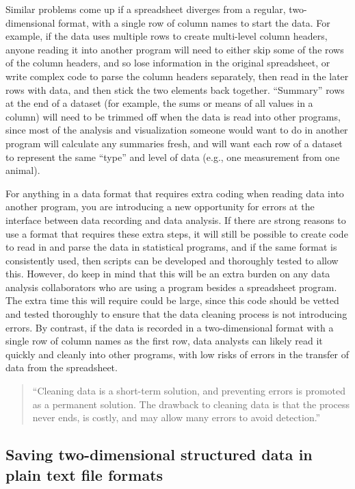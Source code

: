 \documentclass[]{tufte-book}
\begin{document}
Similar problems come up if a spreadsheet diverges from a regular,
two-dimensional format, with a single row of column names to start the data.
For example, if the data uses multiple rows to create multi-level
column headers, anyone reading it into another program will need to
either skip some of the rows of the column headers, and so lose information
in the original spreadsheet, or write complex code to parse the column
headers separately, then read in the later rows with data, and then stick
the two elements back together. ``Summary'' rows at the end of a dataset
(for example, the sums or means of all values in a column) will need to
be trimmed off when the data is read into other programs, since most
of the analysis and visualization someone would want to do in another
program will calculate any summaries fresh, and will want each row of
a dataset to represent the same ``type'' and level of data (e.g., one measurement
from one animal).

For anything in a data format that requires extra coding when reading data into
another program, you are introducing a new opportunity for errors at the
interface between data recording and data analysis. If there are strong reasons
to use a format that requires these extra steps, it will still be possible to
create code to read in and parse the data in statistical programs, and if the
same format is consistently used, then scripts can be developed and thoroughly
tested to allow this. However, do keep in mind that this will be an extra
burden on any data analysis collaborators who are using a program besides a
spreadsheet program. The extra time this will require could be large, since
this code should be vetted and tested thoroughly to ensure that the data
cleaning process is not introducing errors. By contrast, if the data is
recorded in a two-dimensional format with a single row of column names as
the first row, data analysts can likely read it quickly and cleanly into
other programs, with low risks of errors in the transfer of data from the
spreadsheet.

\begin{quote}
``Cleaning data is a short-term solution, and preventing errors is promoted as
a permanent solution. The drawback to cleaning data is that the process never
ends, is costly, and may allow many errors to avoid detection.''
\citep{keller2017evolution}
\end{quote}

\hypertarget{saving-two-dimensional-structured-data-in-plain-text-file-formats}{%
\subsection{Saving two-dimensional structured data in plain text file formats}\label{saving-two-dimensional-structured-data-in-plain-text-file-formats}}
\end{document}

